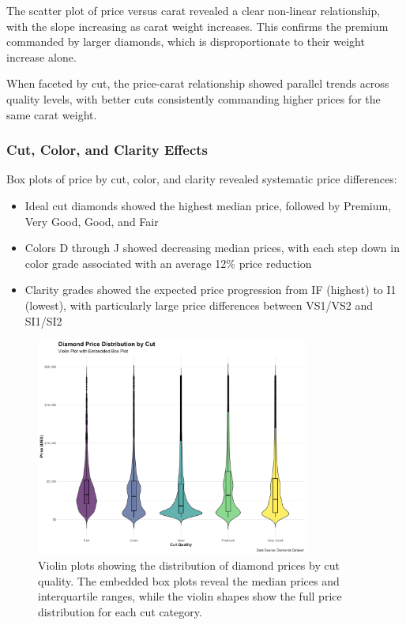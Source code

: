 \documentclass[11pt,a4paper]{article}
\begin{document}
The scatter plot of price versus carat revealed a clear non-linear relationship, with the slope increasing as carat weight increases. This confirms the premium commanded by larger diamonds, which is disproportionate to their weight increase alone.

When faceted by cut, the price-carat relationship showed parallel trends across quality levels, with better cuts consistently commanding higher prices for the same carat weight.

\subsubsection{Cut, Color, and Clarity Effects}

Box plots of price by cut, color, and clarity revealed systematic price differences:

\begin{itemize}
    \item Ideal cut diamonds showed the highest median price, followed by Premium, Very Good, Good, and Fair
    \item Colors D through J showed decreasing median prices, with each step down in color grade associated with an average 12\% price reduction
    \item Clarity grades showed the expected price progression from IF (highest) to I1 (lowest), with particularly large price differences between VS1/VS2 and SI1/SI2
\end{itemize}

\begin{figure}[H]
    \centering
    \includegraphics[width=0.8\textwidth]{cut_violin_plot.png}
    \caption{Violin plots showing the distribution of diamond prices by cut quality. The embedded box plots reveal the median prices and interquartile ranges, while the violin shapes show the full price distribution for each cut category.}
    \label{fig:cut_violin}
\end{figure}
\end{document}
